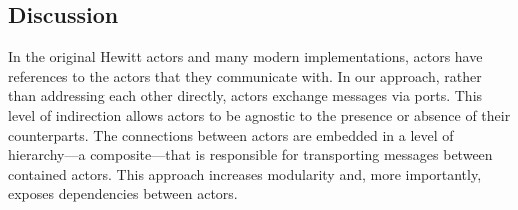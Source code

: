 \documentclass[sigconf]{acmart}
\newcommand{\martin}[1]{\mynote{Martin}{#1}{blue}}%
\newcommand{\marten}[1]{\mynote{Marten}{#1}{cyan}}%
\newcommand{\marjan}[1]{\mynote{Marjan}{#1}{magenta}}%
\begin{document}






\subsection{Discussion}

In the original Hewitt actors and many modern implementations, actors have references to the actors that they communicate with.
In our approach, rather than addressing each other directly, actors exchange messages via ports. This level of indirection allows actors to be agnostic to the presence or absence of their counterparts. The connections between actors are embedded in a level of hierarchy---a composite---that is responsible for transporting messages between contained actors. This approach increases modularity and, more importantly, exposes dependencies between actors.
\end{document}
